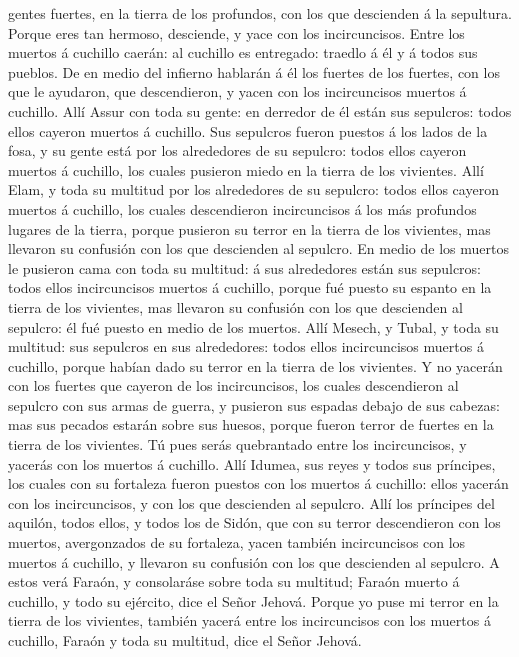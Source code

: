 gentes fuertes, en la tierra de los profundos, con los que descienden á
la sepultura.  Porque eres tan hermoso, desciende, y yace
con los incircuncisos.  Entre los muertos á cuchillo
caerán: al cuchillo es entregado: traedlo á él y á todos sus pueblos.
 De en medio del infierno hablarán á él los fuertes de los
fuertes, con los que le ayudaron, que descendieron, y yacen con los
incircuncisos muertos á cuchillo.  Allí Assur con toda su
gente: en derredor de él están sus sepulcros: todos ellos cayeron
muertos á cuchillo.  Sus sepulcros fueron puestos á los
lados de la fosa, y su gente está por los alrededores de su sepulcro:
todos ellos cayeron muertos á cuchillo, los cuales pusieron miedo en la
tierra de los vivientes.  Allí Elam, y toda su multitud por
los alrededores de su sepulcro: todos ellos cayeron muertos á cuchillo,
los cuales descendieron incircuncisos á los más profundos lugares de la
tierra, porque pusieron su terror en la tierra de los vivientes, mas
llevaron su confusión con los que descienden al sepulcro. 
En medio de los muertos le pusieron cama con toda su multitud: á sus
alrededores están sus sepulcros: todos ellos incircuncisos muertos á
cuchillo, porque fué puesto su espanto en la tierra de los vivientes,
mas llevaron su confusión con los que descienden al sepulcro: él fué
puesto en medio de los muertos.  Allí Mesech, y Tubal, y
toda su multitud: sus sepulcros en sus alrededores: todos ellos
incircuncisos muertos á cuchillo, porque habían dado su terror en la
tierra de los vivientes.  Y no yacerán con los fuertes que
cayeron de los incircuncisos, los cuales descendieron al sepulcro con
sus armas de guerra, y pusieron sus espadas debajo de sus cabezas: mas
sus pecados estarán sobre sus huesos, porque fueron terror de fuertes en
la tierra de los vivientes.  Tú pues serás quebrantado
entre los incircuncisos, y yacerás con los muertos á cuchillo.
 Allí Idumea, sus reyes y todos sus príncipes, los cuales
con su fortaleza fueron puestos con los muertos á cuchillo: ellos
yacerán con los incircuncisos, y con los que descienden al sepulcro.
 Allí los príncipes del aquilón, todos ellos, y todos los
de Sidón, que con su terror descendieron con los muertos, avergonzados
de su fortaleza, yacen también incircuncisos con los muertos á cuchillo,
y llevaron su confusión con los que descienden al sepulcro.
 A estos verá Faraón, y consolaráse sobre toda su multitud;
Faraón muerto á cuchillo, y todo su ejército, dice el Señor Jehová.
 Porque yo puse mi terror en la tierra de los vivientes,
también yacerá entre los incircuncisos con los muertos á cuchillo,
Faraón y toda su multitud, dice el Señor Jehová.

